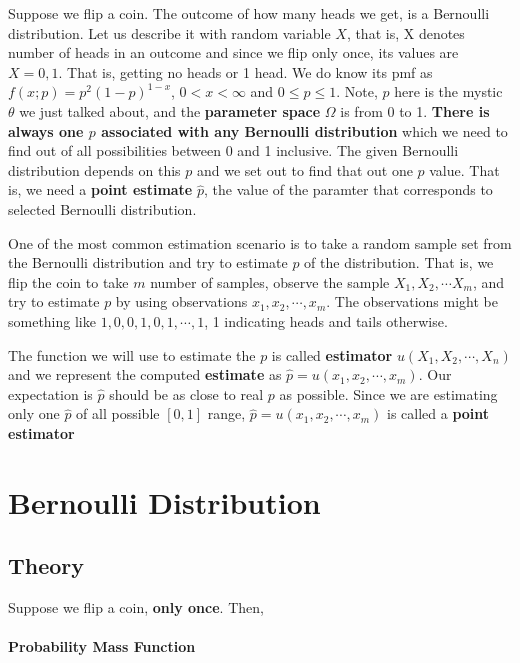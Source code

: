 \documentclass[float=false,crop=false]{standalone}
\begin{document}
Suppose we flip a coin. The outcome of how many heads we get, is a
Bernoulli distribution. Let us describe it with random variable \(X\),
that is, X denotes number of heads in an outcome and since we flip only
once, its values are \(X = 0,1\). That is, getting no heads or 1 head.
We do know its pmf as \(f(x;p) = p^2(1-p)^{1-x}\), \(0<x<\infty\) and
\(0 \leq p \leq 1\). Note, \(p\) here is the mystic \(\theta\) we just
talked about, and the \textbf{parameter space} \(\Omega\) is from 0 to
1. \textbf{There is always one \(p\) associated with any Bernoulli
distribution} which we need to find out of all possibilities between 0
and 1 inclusive. The given Bernoulli distribution depends on this \(p\)
and we set out to find that out one \(p\) value. That is, we need a
\textbf{point estimate} \(\hat{p}\), the value of the paramter that
corresponds to selected Bernoulli distribution.

One of the most common estimation scenario is to take a random sample
set from the Bernoulli distribution and try to estimate \(p\) of the
distribution. That is, we flip the coin to take \(m\) number of samples,
observe the sample \(X_1, X_2, \cdots X_m\), and try to estimate \(p\)
by using observations \(x_1,x_2,\cdots,x_m\). The observations might be
something like \(1,0,0,1,0,1,\cdots,1\), 1 indicating heads and tails
otherwise.

The function we will use to estimate the \(p\) is called
\textbf{estimator} \(u(X_1,X_2,\cdots,X_n)\) and we represent the
computed \textbf{estimate} as \(\hat{p} = u(x_1,x_2,\cdots,x_m)\). Our
expectation is \(\hat{p}\) should be as close to real \(p\) as possible.
Since we are estimating only one \(\hat{p}\) of all possible \([0,1]\)
range, \(\hat{p} = u(x_1,x_2,\cdots,x_m)\) is called a \textbf{point
estimator}

    \section{Bernoulli Distribution}\label{bernoulli-distribution}

\subsection{Theory}\label{theory}

Suppose we flip a coin, \textbf{only once}. Then,

\paragraph{Probability Mass Function}\label{probability-mass-function}
\end{document}
